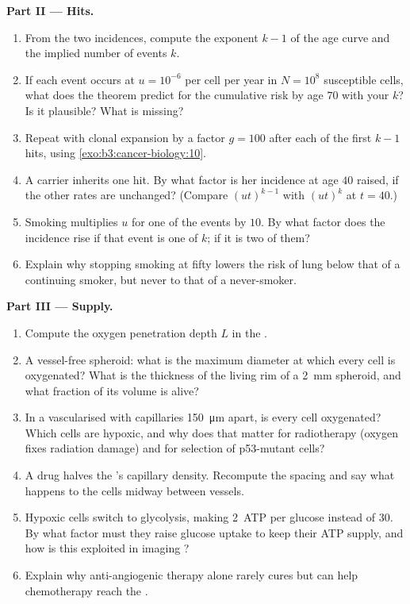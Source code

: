 \begin{problem}
\medskip
\noindent\textbf{Part II --- Hits.}
\begin{enumerate}[resume]
  \item From the two incidences, compute the exponent $k - 1$ of the
        age curve and the implied number of events $k$.
  \item If each event occurs at $u = 10^{-6}$ per cell per year in
        $N = 10^{8}$ susceptible cells, what does the theorem predict
        for the cumulative risk by age $70$ with your $k$? Is it
        plausible? What is missing?
  \item Repeat with clonal expansion by a factor $g = 100$ after each
        of the first $k - 1$ hits, using
        \cref{exo:b3:cancer-biology:10}.
  \item A carrier inherits one hit. By what factor is her incidence at
        age $40$ raised, if the other rates are unchanged? (Compare
        $(ut)^{k-1}$ with $(ut)^{k}$ at $t = 40$.)
  \item Smoking multiplies $u$ for one of the events by $10$. By what
        factor does the incidence rise if that event is one of $k$;
        if it is two of them?
  \item Explain why stopping smoking at fifty lowers the risk of lung
         below that of a continuing smoker, but never to that of
        a never-smoker.
\end{enumerate}

\medskip
\noindent\textbf{Part III --- Supply.}
\begin{enumerate}[resume]
  \item Compute the oxygen penetration depth $L$ in the .
  \item A vessel-free spheroid: what is the maximum diameter at which
        every cell is oxygenated? What is the thickness of the living
        rim of a \qty{2}{mm} spheroid, and what fraction of its volume
        is alive?
  \item In a vascularised  with capillaries \qty{150}{\micro m}
        apart, is every cell oxygenated? Which cells are hypoxic, and
        why does that matter for radiotherapy (oxygen fixes radiation
        damage) and for selection of p53-mutant cells?
  \item A drug halves the 's capillary density. Recompute the
        spacing and say what happens to the cells midway between
        vessels.
  \item Hypoxic cells switch to glycolysis, making \qty{2}{ATP} per
        glucose instead of $30$. By what factor must they raise glucose
        uptake to keep their ATP supply, and how is this exploited in
        imaging ?
  \item Explain why anti-angiogenic therapy alone rarely cures but can
        help chemotherapy reach the .
\end{enumerate}


\end{problem}
